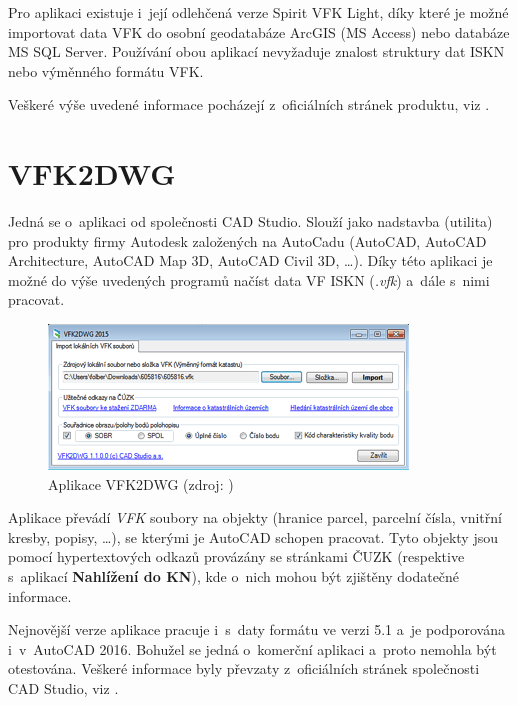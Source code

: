 \documentclass[a4paper,12pt,oneside]{book}
\begin{document}
Pro aplikaci existuje i~její odlehčená verze Spirit VFK Light, díky
které je možné importovat data VFK do osobní geodatabáze ArcGIS (MS
Access) nebo databáze MS SQL Server. Používání obou aplikací
nevyžaduje znalost struktury dat ISKN nebo výměnného formátu VFK.

Veškeré výše uvedené informace pocházejí z~oficiálních stránek
produktu, viz \cite{spirit_vfk}.

\section{VFK2DWG}
\label{l_vfk2dwg}
Jedná se o~aplikaci od společnosti CAD Studio. Slouží jako nadstavba
(utilita) pro produkty firmy Autodesk založených na AutoCadu (AutoCAD,
AutoCAD Architecture, AutoCAD Map 3D, AutoCAD Civil 3D, \dots). Díky
této aplikaci je možné do výše uvedených programů načíst data VF ISKN
(\textit{.vfk}) a~dále s~nimi pracovat.

\begin{figure}[htb]
\centering
\includegraphics[scale=0.85]{images/vfk2dwg-aplikace.png}
\caption[Aplikace VFK2DWG]{Aplikace VFK2DWG (zdroj: \cite{cadstudio-vfk2dwg})}
\end{figure}

Aplikace převádí \textit{VFK} soubory na objekty (hranice parcel,
parcelní čísla, vnitřní kresby, popisy, \dots), se kterými je AutoCAD
schopen pracovat. Tyto objekty jsou pomocí hypertextových odkazů
provázány se stránkami ČUZK (respektive s~aplikací \textbf{Nahlížení
  do KN}), kde o~nich mohou být zjištěny dodatečné informace.


Nejnovější verze aplikace pracuje i~s~daty formátu ve verzi 5.1 a~je
podporována i~v~AutoCAD 2016. Bohužel se jedná o~komerční aplikaci
a~proto nemohla být otestována. Veškeré informace byly převzaty
z~oficiálních stránek společnosti CAD Studio, viz
\cite{cadstudio-vfk2dwg}.
\end{document}
